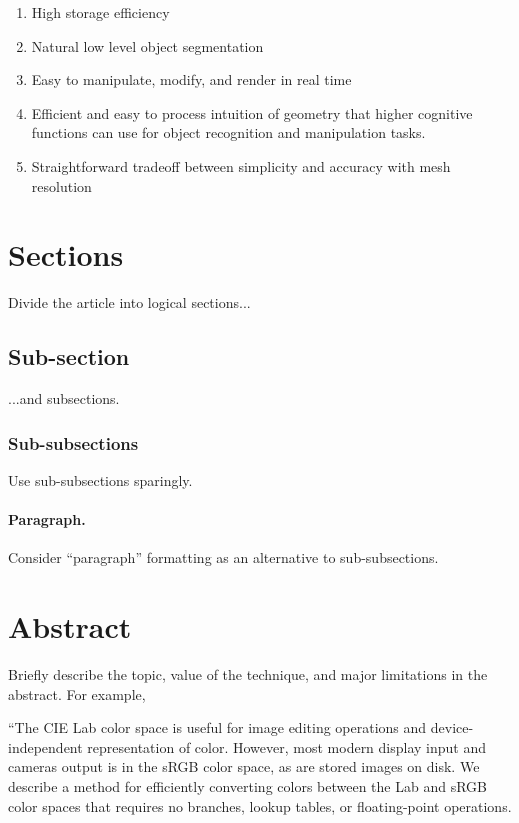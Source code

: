 \documentclass{jcgt}
\begin{document}
\begin{enumerate}
\item High storage efficiency
\item Natural low level object segmentation
\item Easy to manipulate, modify, and render in real time
\item Efficient and easy to process intuition of geometry that higher cognitive functions can use for object recognition and manipulation tasks.
\item Straightforward tradeoff between simplicity and accuracy with mesh resolution
\end{enumerate}

\section{Sections}
Divide the article into logical sections...

\subsection{Sub-section}
...and subsections.

\subsubsection{Sub-subsections}
Use sub-subsections sparingly.

\paragraph{Paragraph.} Consider ``paragraph'' formatting as an alternative to sub-subsections.


\section{Abstract}
Briefly describe the topic, value of the technique, and major limitations in the abstract. For example,

``The CIE Lab color  space is useful for image editing operations and device-independent representation of
color.  However, most modern display  input  and  cameras  output is in the sRGB color space, as are stored images on disk.  We describe a method for
efficiently converting colors between the Lab and sRGB color spaces that requires no branches,  lookup tables, or floating-point operations.
\end{document}
